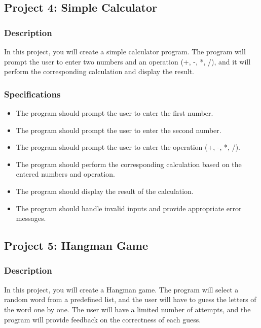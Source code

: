 \documentclass[12pt]{article}
\begin{document}
\newpage

\subsection{Project 4: Simple Calculator}

\subsubsection{Description}
In this project, you will create a simple calculator program. The program will prompt the user to enter two numbers and an operation (+, -, *, /), and it will perform the corresponding calculation and display the result.

\subsubsection{Specifications}
\begin{itemize}
\item The program should prompt the user to enter the first number.
\item The program should prompt the user to enter the second number.
\item The program should prompt the user to enter the operation (+, -, *, /).
\item The program should perform the corresponding calculation based on the entered numbers and operation.
\item The program should display the result of the calculation.
\item The program should handle invalid inputs and provide appropriate error messages.
\end{itemize}

\newpage


\subsection{Project 5: Hangman Game}

\subsubsection{Description}
In this project, you will create a Hangman game. The program will select a random word from a predefined list, and the user will have to guess the letters of the word one by one. The user will have a limited number of attempts, and the program will provide feedback on the correctness of each guess.
\end{document}
